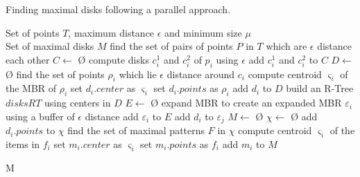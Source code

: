 \documentclass[12pt]{scrartcl}
\begin{document}
\begin{algorithm}
  \footnotesize
  \caption{Finding maximal disks following a parallel approach.}
  \label{alg:maximals}
  \begin{algorithmic}
    \REQUIRE 
    Set of points $T$, maximum distance $\epsilon$ and minimum size $\mu$ \\

    \ENSURE 
    Set of maximal disks $M$ 
    \vspace{3mm}
    \STATE find the set of pairs of points $P$ in $T$ which are $\epsilon$ distance each other
    \STATE $C \leftarrow$ \O{}
      \STATE compute disks $c_i^1$ and $c_i^2$ of $p_i$ using $\epsilon$ 
      \STATE add $c_i^1$ and $c_i^2$ to $C$
    \ENDFOR
    \STATE $D \leftarrow$ \O{}
      \STATE find the set of points $\rho_i$ which lie $\epsilon$ distance around $c_i$ 
		\STATE compute centroid $\varsigma_i$ of the MBR of $\rho_i$ 
		\STATE set $d_i.center$ as $\varsigma_i$
		\STATE set $d_i.points$ as $\rho_i$
			\STATE add $d_i$ to $D$  
		\ENDIF
      \ENDIF
    \ENDFOR
    \STATE build an R-Tree $disksRT$ using centers in $D$ 
    \STATE $E \leftarrow$ \O{}
		\STATE expand MBR to create an expanded MBR $\varepsilon_i$ using a buffer of $\epsilon$ distance 
		\STATE add $\varepsilon_i$ to $E$
	\ENDFOR
				\STATE add $d_i$ to $\varepsilon_j$ 
			\ENDIF
		\ENDFOR
	\ENDFOR
    \STATE $M \leftarrow$ \O{}
		\STATE $\chi \leftarrow$ \O{} 
			\STATE add $d_i.points$ to $\chi$
		\ENDFOR
		\STATE find the set of maximal patterns $F$ in $\chi$
			\STATE compute centroid $\varsigma_i$ of the items in $f_i$
				\STATE set $m_i.center$ as $\varsigma_i$
				\STATE set $m_i.points$ as $f_i$
				\STATE add $m_i$ to $M$
			\ENDIF
		\ENDFOR
	\ENDFOR
	
	\RETURN M
  \end{algorithmic}
\end{algorithm}
\end{document}
